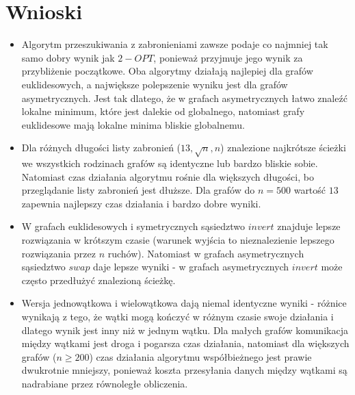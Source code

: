 \documentclass{article}
\begin{document}
\section{Wnioski}
\begin{itemize}
\item Algorytm przeszukiwania z zabronieniami zawsze podaje co najmniej tak samo dobry wynik jak $2-OPT$, ponieważ przyjmuje jego wynik za przybliżenie początkowe. Oba algorytmy działają najlepiej dla grafów euklidesowych, a największe polepszenie wyniku jest dla grafów asymetrycznych. Jest tak dlatego, że w grafach asymetrycznych łatwo znaleźć lokalne minimum, które jest dalekie od globalnego, natomiast grafy euklidesowe mają lokalne minima bliskie globalnemu.
\item Dla różnych długości listy zabronień ($13, \sqrt{n}, n$) znalezione najkrótsze ścieżki we wszystkich rodzinach grafów są identyczne lub bardzo bliskie sobie. Natomiast czas działania algorytmu rośnie dla większych długości, bo przeglądanie listy zabronień jest dłuższe. Dla grafów do $n=500$ wartość $13$ zapewnia najlepszy czas działania i bardzo dobre wyniki.
\item W grafach euklidesowych i symetrycznych sąsiedztwo $invert$ znajduje lepsze rozwiązania w krótszym czasie (warunek wyjścia to nieznalezienie lepszego rozwiązania przez $n$ ruchów). Natomiast w grafach asymetrycznych sąsiedztwo $swap$ daje lepsze wyniki - w grafach asymetrycznych $invert$ może często przedłużyć znalezioną ścieżkę.
\item Wersja jednowątkowa i wielowątkowa dają niemal identyczne wyniki - różnice wynikają z tego, że wątki mogą kończyć w różnym czasie swoje działania i dlatego wynik jest inny niż w jednym wątku. Dla małych grafów komunikacja między wątkami jest droga i pogarsza czas działania, natomiast dla większych grafów ($n\geq 200$) czas działania algorytmu współbieżnego jest prawie dwukrotnie mniejszy, ponieważ koszta przesyłania danych między wątkami są nadrabiane przez równoległe obliczenia.  
\end{itemize}
\end{document}
